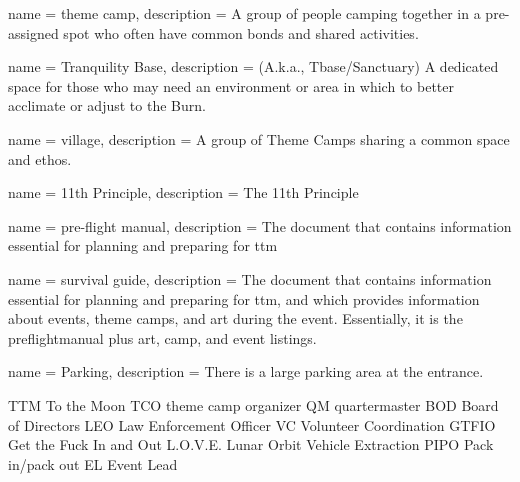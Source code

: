  {
name = {theme camp},
description = {A group of people camping together in a pre-assigned spot who often have common bonds and shared activities.}
}

 {
name = {Tranquility Base},
description = {(A.k.a., Tbase/Sanctuary) A dedicated space for those who may need an environment or area in which to better acclimate or adjust to the Burn.}
}

 {
name = {village},
description = {A group of Theme Camps sharing a common space and ethos.}
}

 {
name = {11th Principle},
description = {The 11th Principle}
}


 {
name = {pre-flight manual},
description = {The document that contains information essential for planning and preparing for \gls{ttm}}
}


 {
name = {survival guide},
description = {The document that contains information essential for planning and preparing for \gls{ttm}, and which provides information about events, theme camps, and art during the event.  Essentially, it is the \gls{preflightmanual} plus art, camp, and event listings.}
}


 {
name = {Parking},
description = {There is a large parking area at the entrance.}
}





   {TTM}      {To the Moon}
   {TCO}      {theme camp organizer}
    {QM}       {quartermaster}
   {BOD}      {Board of Directors}
   {LEO}      {Law Enforcement Officer}
    {VC}       {Volunteer Coordination}
 {GTFIO}    {Get the Fuck In and Out}
  {L.O.V.E.} {Lunar Orbit Vehicle Extraction}
  {PIPO}     {Pack in/pack out}
    {EL}       {Event Lead}




